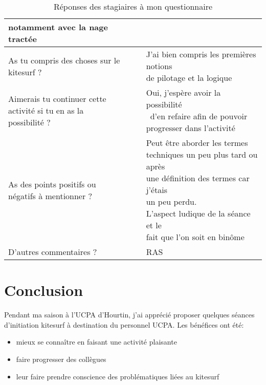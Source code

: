 \documentclass[12pt,a4paper]{report}
\begin{document}
\begin{table}
\begin{tabular}{|p{6cm}|p{1.6cm}|p{7cm}|}
{                                         notamment avec la nage tractée} \\
        \hline  
        As tu compris des choses sur le kitesurf ? & &  \shortstack{J'ai bien compris les premières notions  \\    
                                                                    de pilotage et la logique} \\
        \hline
        \shortstack{Aimerais tu continuer cette \\ 
         activité si tu en as la  \\
                                     possibilité ?}          & & \shortstack{Oui, j'espère avoir la possibilité\\\ d'en refaire afin de pouvoir \\progresser dans l'activité} \\
      \hline
      \shortstack{As des points positifs ou \\
 négatifs  à mentionner ?}                                 & & \shortstack{Peut \^etre aborder les termes \\
                                                                        techniques un peu plus tard ou après \\
                                                                        une définition des termes car j'étais \\
                                                                        un peu perdu. \\
                                                                        L'aspect ludique de la séance et le \\
                                                                        fait que l'on soit en bin\^ome}  \\
      \hline
          D'autres commentaires ?                       &  &  RAS   \\
      \hline
                                                                        
\end{tabular}
\caption{Réponses des stagiaires à mon questionnaire\label{questionnaire}}
\end{table}


\section{Conclusion}

Pendant ma saison à l'UCPA d'Hourtin, j'ai apprécié proposer quelques 
séances d'initiation kitesurf à destination du personnel UCPA.
Les bénéfices ont été:
\begin{itemize}
\item mieux se connaître en faisant une activité plaisante
\item faire progresser des collègues
\item leur faire prendre conscience  des problématiques liées au kitesurf
\end{itemize}
\end{document}

